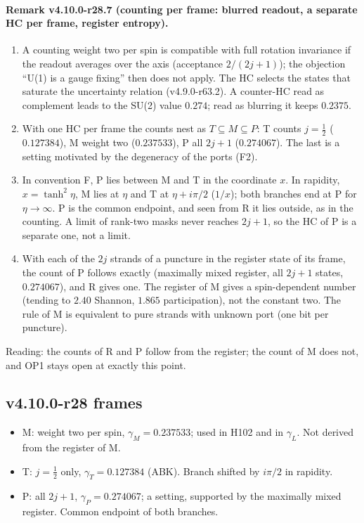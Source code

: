 \paragraph{Remark v4.10.0-r28.7 (counting per frame: blurred readout, a separate HC per frame, register entropy).}
\begin{enumerate}[leftmargin=2em]
\item[(a)] A counting weight two per spin is compatible with full rotation invariance if the readout averages over the axis
(acceptance \(2/(2j+1)\)); the objection ``U(1) is a gauge fixing'' then does not apply.  The HC selects the states that saturate the
uncertainty relation (v4.9.0-r63.2).  A counter-HC read as complement leads to the SU(2) value \(0.274\); read as blurring it keeps \(0.2375\).
\item[(b)] With one HC per frame the counts nest as \(T\subseteq M\subseteq P\): T counts \(j=\tfrac12\) (\(0.127384\)), M weight two
(\(0.237533\)), P all \(2j+1\) (\(0.274067\)).  The last is a setting motivated by the degeneracy of the ports (F2).
\item[(c)] In convention F, P lies between M and T in the coordinate \(x\).  In rapidity, \(x=\tanh^2\eta\), M lies at \(\eta\) and T at
\(\eta+i\pi/2\) (\(1/x\)); both branches end at P for \(\eta\to\infty\).  P is the common endpoint, and seen from R it lies outside, as in the
counting.  A limit of rank-two masks never reaches \(2j+1\), so the HC of P is a separate one, not a limit.
\item[(d)] With each of the \(2j\) strands of a puncture in the register state of its frame, the count of P follows exactly (maximally mixed
register, all \(2j+1\) states, \(0.274067\)), and R gives one.  The register of M gives a spin-dependent number (tending to \(2.40\) Shannon,
\(1.865\) participation), not the constant two.  The rule of M is equivalent to pure strands with unknown port (one bit per puncture).
\end{enumerate}
Reading: the counts of R and P follow from the register; the count of M does not, and OP1 stays open at exactly this point.

\subsection*{v4.10.0-r28 frames}
\label{subsec:v4100-r28-frames}

\begin{itemize}[leftmargin=2em]
\item M: weight two per spin, \(\gamma_M=0.237533\); used in H102 and in \(\gamma_L\).  Not derived from the register of M.
\item T: \(j=\tfrac12\) only, \(\gamma_T=0.127384\) (ABK).  Branch shifted by \(i\pi/2\) in rapidity.
\item P: all \(2j+1\), \(\gamma_P=0.274067\); a setting, supported by the maximally mixed register.  Common endpoint of both branches.
\end{itemize}

